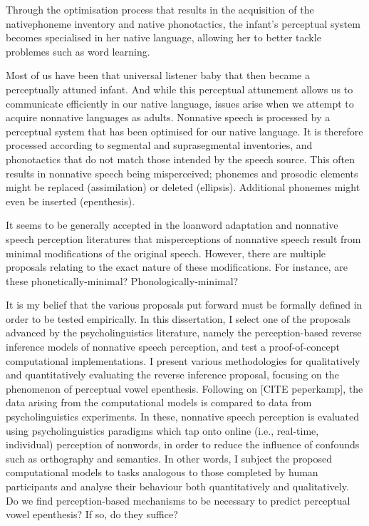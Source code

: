 Through the optimisation process that results in the acquisition of the nativephoneme inventory and native phonotactics, the infant's perceptual system becomes specialised in her native language, allowing her to better tackle problemes such as word learning.  

Most of us have been that universal listener baby that then became a perceptually attuned infant. And while this perceptual attunement allows us to communicate efficiently in our native language, issues arise when we attempt to acquire nonnative languages as adults.
Nonnative speech is processed by a perceptual system that has been optimised for our native language. It is therefore processed according to segmental and suprasegmental inventories, and phonotactics that do not match those intended by the speech source. 
This often results in nonnative speech being misperceived; phonemes and prosodic elements might be replaced (assimilation) or deleted (ellipsis). Additional phonemes might even be inserted (epenthesis).

It seems to be generally accepted in the loanword adaptation and nonnative speech perception literatures that misperceptions of nonnative speech result from minimal modifications of the original speech. However, there are multiple proposals relating to the exact nature of these modifications. For instance, are these phonetically-minimal? Phonologically-minimal?    

It is my belief that the various proposals put forward must be formally defined in order to be tested empirically.  
In this dissertation, I select one of the proposals advanced by the psycholinguistics literature, namely the perception-based reverse inference models of nonnative speech perception, and test a proof-of-concept computational implementations. 
I present various methodologies for qualitatively and quantitatively evaluating the reverse inference proposal, focusing on the phenomenon of perceptual vowel epenthesis. Following on [CITE peperkamp], the data arising from the computational models is compared to data from psycholinguistics experiments. In these, nonnative speech perception is evaluated using psycholinguistics paradigms which tap onto online (i.e., real-time, individual) perception of nonwords, in order to reduce the influence of confounds such as orthography and semantics.
In other words, I subject the proposed computational models to tasks analogous to those completed by human participants and analyse their behaviour both quantitatively and qualitatively. Do we find perception-based mechanisms to be necessary to predict perceptual vowel epenthesis? If so, do they suffice? 

